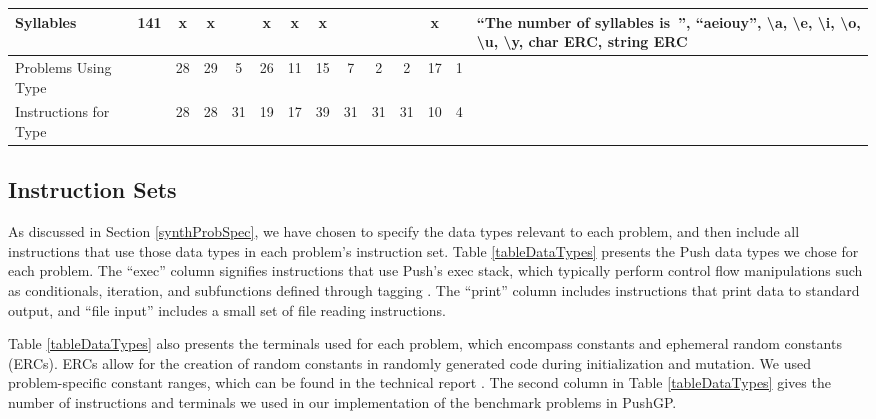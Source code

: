 \documentclass{sig-alternate}
\begin{document}
\begin{table*}
\begin{tabular}{>{\raggedright}p{3.1cm}rccccccccccc>{\raggedright}p{5.5cm}}
Syllables                  & 141             & x    & x       &       & x       & x    & x      &                    &                  &                   & x     &            & ``The number of syllables is~'', ``aeiouy'', \textbackslash a, \textbackslash e, \textbackslash i, \textbackslash o, \textbackslash u, \textbackslash y, char ERC, string ERC                                                   \tabularnewline
\midrule
\rowcolor{white} Problems Using Type                      &                 & 28   & 29      & 5     & 26      & 11   & 15     & 7                  & 2                & 2                 & 17    & 1          &                                                                                                                                                                                                                             \tabularnewline
\rowcolor{white} Instructions for Type     &                 & 28   & 28      & 31    & 19      & 17   & 39     & 31                 & 31               & 31                & 10    & 4          &                                                                                                                                                                                                                             \tabularnewline
\bottomrule
\end{tabular}
\end{table*}

\subsection{Instruction Sets}

As discussed in Section \ref{synthProbSpec}, we have chosen to specify the data types relevant to each problem, and then include all instructions that use those data types in each problem's instruction set. Table \ref{tableDataTypes} presents the Push data types we chose for each problem. The ``exec'' column signifies instructions that use Push's exec stack, which typically perform control flow manipulations such as conditionals, iteration, and subfunctions defined through tagging \cite{Spector:2011:GECCO}. The ``print'' column includes instructions that print data to standard output, and ``file input'' includes a small set of file reading instructions. 


Table \ref{tableDataTypes} also presents the terminals used for each problem, which encompass constants and ephemeral random constants (ERCs). ERCs allow for the creation of random constants in randomly generated code during initialization and mutation. We used problem-specific constant ranges, which can be found in the technical report \cite{helmuth:umass:tr}.
The second column in Table \ref{tableDataTypes} gives the number of instructions and terminals we used in our implementation of the benchmark problems in PushGP. 
\end{document}
